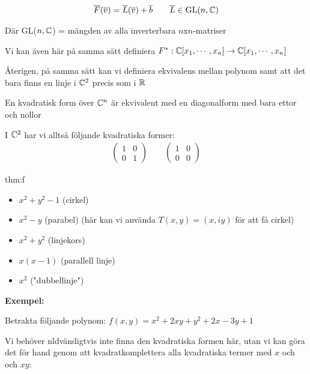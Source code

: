 \begin{equation*}
  \begin{gathered}
    \overline{F}(\overline{v}) = \overline{L}(\overline{v})+\overline{b}\qquad\overline{L}\in\text{GL}(n,\mathbb{C})
  \end{gathered}
\end{equation*}
\par\bigskip
\noindent Där GL($n,\mathbb{C}$) = mängden av alla inverterbara $n$x$n$-matriser
\par\bigskip
\noindent Vi kan även här på samma sätt definiera $F^*:\mathbb{C}[x_1,\cdots,x_n]\to\mathbb{C}[x_1,\cdots,x_n]$ 
\par\bigskip
\noindent Återigen, på samma sätt kan vi definiera ekvivalens mellan polynom samt att det bara finns en linje i $\mathbb{C}^2$ precis som i $\mathbb{R}$ 
\par\bigskip
\noindent En kvadratisk form över $\mathbb{C}^n$ är ekvivalent med en diagonalform med bara ettor och nollor\par
\noindent I $\mathbb{C}^2$ har vi alltså följande kvadratiska former:
\begin{equation*}
  \begin{gathered}
    \begin{pmatrix}1&0\\0&1\end{pmatrix}\qquad\begin{pmatrix}1&0\\0&0\end{pmatrix}
  \end{gathered}
\end{equation*}
\par\bigskip
\begin{theo}{thm:f}
  \begin{itemize}
    \item $x^2+y^2-1$ (cirkel)
    \item $x^2-y$ (parabel) (här kan vi använda $T(x,y) = (x,iy)$ för att få cirkel)
    \item $x^2+y^2$ (linjekors)
    \item $x(x-1)$ (parallell linje)
    \item $x^2$ ("dubbellinje")
  \end{itemize}
\end{theo}
\par\bigskip
\noindent\textbf{Exempel:}\par
\noindent Betrakta följande polynom: $f(x,y) = x^2+2xy+y^2+2x-3y+1$\par
\noindent Vi behöver nldvändigtvis inte finna den kvadratiska formen här, utan vi kan göra det för hand genom att kvadratkomplettera alla kvadratiska termer med $x$ och och $xy$:
